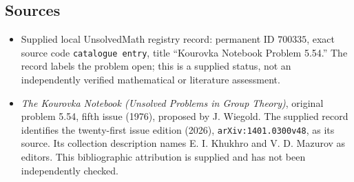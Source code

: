 \documentclass[11pt]{article}
\begin{document}
\subsection{Sources}
\begin{itemize}
\item Supplied local UnsolvedMath registry record: permanent ID \(700335\), exact source code \texttt{catalogue entry}, title ``Kourovka Notebook Problem 5.54.'' The record labels the problem open; this is a supplied status, not an independently verified mathematical or literature assessment.
\item \emph{The Kourovka Notebook (Unsolved Problems in Group Theory)}, original problem 5.54, fifth issue (1976), proposed by J. Wiegold. The supplied record identifies the twenty-first issue edition (2026), \texttt{arXiv:1401.0300v48}, as its source. Its collection description names E. I. Khukhro and V. D. Mazurov as editors. This bibliographic attribution is supplied and has not been independently checked.
\end{itemize}
\end{document}
